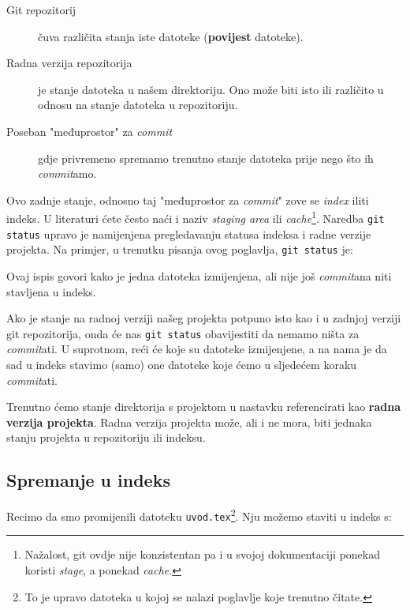 \begin{description}
	\item[Git repozitorij] čuva različita stanja iste datoteke (\textbf{povijest} datoteke).
	\item[Radna verzija repozitorija] je stanje datoteka u našem direktoriju. Ono može biti isto ili različito u odnosu na stanje datoteka u repozitoriju.
	\item[Poseban "međuprostor" za \emph{commit}] gdje privremeno spremamo trenutno stanje datoteka prije nego što ih \emph{commit}amo.
\end{description}

Ovo zadnje stanje, odnosno taj "međuprostor za \emph{commit}" zove se \emph{index} iliti indeks.
U literaturi ćete često naći i naziv \emph{staging area} ili \emph{cache}\footnote{Nažalost, git ovdje nije konzistentan pa i u svojoj dokumentaciji ponekad koristi \emph{stage}, a ponekad \emph{cache}.}.
Naredba \verb+git status+ upravo je namijenjena pregledavanju statusa indeksa i radne verzije projekta.
Na primjer, u trenutku pisanja ovog poglavlja, \verb+git status+ je:



Ovaj ispis govori kako je jedna datoteka izmijenjena, ali nije još \emph{commit}ana niti stavljena u indeks.

Ako je stanje na radnoj verziji našeg projekta potpuno isto kao i u zadnjoj verziji git repozitorija, onda će nas \verb+git status+ obavijestiti da nemamo ništa za \emph{commit}ati.
U suprotnom, reći će koje su datoteke izmijenjene, a na nama je da sad u indeks stavimo (samo) one datoteke koje ćemo u sljedećem koraku \emph{commit}ati.

Trenutno ćemo stanje direktorija s projektom u nastavku referencirati kao \textbf{radna verzija projekta}.
Radna verzija projekta može, ali i ne mora, biti jednaka stanju projekta u repozitoriju ili indeksu.

\subsection*{Spremanje u indeks}

Recimo da smo promijenili datoteku \verb+uvod.tex+\footnote{To je upravo datoteka u kojoj se nalazi poglavlje koje trenutno čitate.}.
Nju možemo staviti u indeks s:


